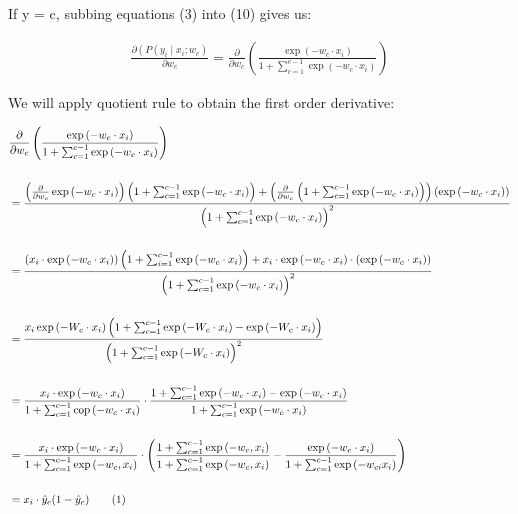 \documentclass{article}
\newcommand\numberthis{\addtocounter{equation}{1}\tag{\theequation}}
\begin{document}
If y = c, subbing equations (3) into (10) gives us:

$$
\begin{aligned}
    \frac{\partial\left(P\left(y_i \mid x_i ; w_c\right)\right.}{\partial w_c} = \frac{\partial}{\partial w_c}\left(\frac{\exp \left(-w_c \cdot x_i \right)}{1+\sum_{c=1}^{c-1} \exp \left(-w_c \cdot x_i \right)}\right)
\end{aligned}
$$
\linebreak

We will apply quotient rule to obtain the first order derivative:


\begin{align*}
    & \frac{\partial}{\partial w_c}\left(\frac{\exp \left(-w_c \cdot x_i \right)}{1+\sum_{c=1}^{c-1} \exp \left(-w_c \cdot x_i \right)}\right) \\
    \\
    & =\frac{\left(\frac{\partial}{\partial w_c} \exp \left(-w_c \cdot x_i\right)\right)\left(1+\sum_{c=1}^{c-1} \exp \left(-w_c \cdot x_i\right)\right)+\left(\frac{\partial}{\partial w_c}\left(1+\sum_{c=1}^{c-1} \exp \left(-w_c \cdot x_i\right)\right)\right)\left(\exp \left(-w_c \cdot x_i\right)\right)}{\left(1+\sum_{c=1}^{c-1} \exp \left(-w_c \cdot x_i\right)\right)^2} \\
    \\
    & =\frac{\left(x_i \cdot \exp \left(-w_c \cdot x_i\right)\right)\left(1+\sum_{i=1}^{c-1} \exp \left(-w_c \cdot x_i\right)\right)+x_i \cdot \exp \left(-w_c \cdot x_i\right) \cdot\left(\exp \left(-w_c \cdot x_i\right)\right)}{\left(1+\sum_{c=1}^{c-1} \exp \left(-w_c \cdot x_i\right)\right)^2} \\ 
    \\
    & =\frac{x_i \exp \left(-W_c \cdot x_i\right)\left(1+\sum_{c=1}^{c-1} \exp \left(-W_c \cdot x_i\right)-\exp \left(-W_c \cdot x_i\right)\right)}{\left(1+\sum_{c=1}^{c-1} \exp \left(-W_c \cdot x_i\right)\right)^2} \\
    \\
    & =\frac{x_i \cdot \exp \left(-w_c \cdot x_i\right)}{1+\sum_{c=1}^{c-1} \operatorname{cop}\left(-w_c \cdot x_i\right)} \cdot \frac{1+\sum_{c=1}^{c-1} \exp \left(-w_c \cdot x_i\right)-\exp \left(-w_c \cdot x_i\right)}{1+\sum_{c=1}^{c-1} \exp \left(-w_c \cdot x_i\right)} \\
    \\
    & =\frac{x_i \cdot \exp \left(-w_c \cdot x_i\right)}{1+\sum_{c=1}^{c-1} \exp \left(-w_c, x_i\right)} \cdot\left(\frac{1+\sum_{c=1}^{c-1} \exp \left(-w_c, x_i\right)}{1+\sum_{c=1}^{c-1} \exp \left(-w_c, x_i\right)}-\frac{\exp \left(-w_c \cdot x_i\right)}{1+\sum_{c=1}^{c-1} \exp \left(-w_{c i} x_i\right)}\right) \\
    \\
    & =x_i \cdot \hat{y}_c(1-\hat{y}_c) \numberthis \label{eqn}
\end{align*}
\end{document}
